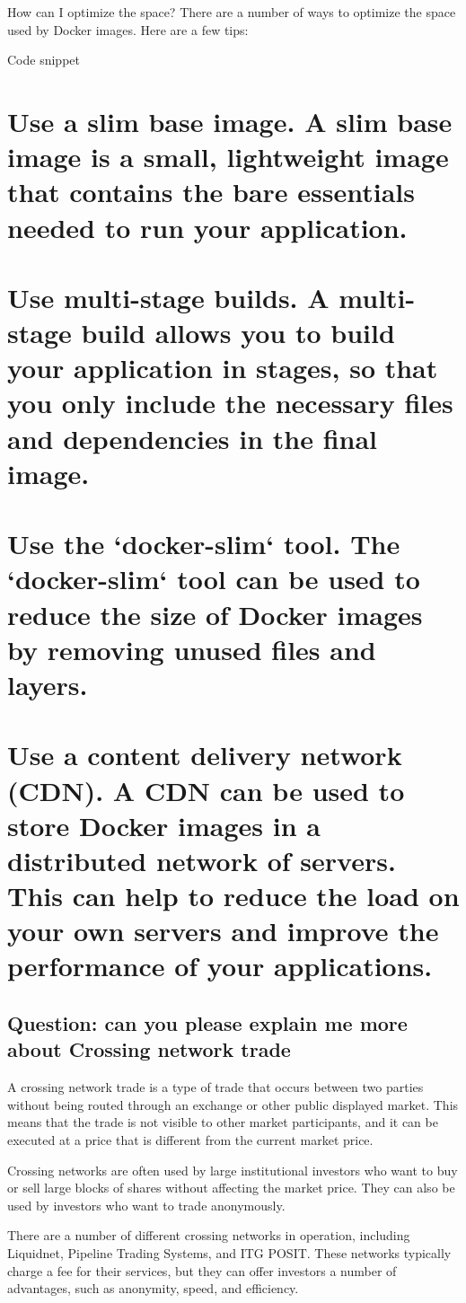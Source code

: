 \documentclass[11pt]{article}
\begin{document}
How can I optimize the space?
There are a number of ways to optimize the space used by Docker images. Here are a few tips:

Code snippet
\section{Use a slim base image. A slim base image is a small, lightweight image that contains the bare essentials needed to run your application.}
\label{sec:org1fcaaa3}
\section{Use multi-stage builds. A multi-stage build allows you to build your application in stages, so that you only include the necessary files and dependencies in the final image.}
\label{sec:orgc6b505d}
\section{Use the `docker-slim` tool. The `docker-slim` tool can be used to reduce the size of Docker images by removing unused files and layers.}
\label{sec:orgd981cfb}
\section{Use a content delivery network (CDN). A CDN can be used to store Docker images in a distributed network of servers. This can help to reduce the load on your own servers and improve the performance of your applications.}
\label{sec:orgf599a21}


\subsection{Question: can you please explain me more about Crossing network trade}
\label{sec:orgebf8cd3}

A crossing network trade is a type of trade that occurs between two parties without being routed through an exchange or other public displayed market. This means that the trade is not visible to other market participants, and it can be executed at a price that is different from the current market price.

Crossing networks are often used by large institutional investors who want to buy or sell large blocks of shares without affecting the market price. They can also be used by investors who want to trade anonymously.

There are a number of different crossing networks in operation, including Liquidnet, Pipeline Trading Systems, and ITG POSIT. These networks typically charge a fee for their services, but they can offer investors a number of advantages, such as anonymity, speed, and efficiency.
\end{document}
